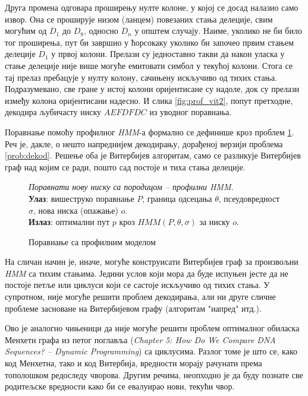 \documentclass[12pt,oneside]{memoir}
\newenvironment{problem}[1][!ht]
{\renewcommand{\algorithmcfname}{Проблем}
\begin{figure}[!ht]
\centering
  \begin{minipage}{.94\linewidth}
	\begin{algorithm}[#1]%
  }{\end{algorithm}
  \end{minipage}
\end{figure}}
\begin{document}
\begin{CJK}{UTF8}{ipxm}
Друга промена одговара проширењу нулте колоне, у којој се досад налазио само извор. Она се проширује низом (ланцем) повезаних стања делеције, свим могућим од $D_1$ до $D_8$, односно $D_n$ у општем случају. Наиме, уколико не би било тог проширења, пут би завршио у ћорсокаку уколико би започео првим стањем делеције $D_1$ у првој колони. Прелази су једноставно такви да након уласка у стање делеције није више могуће емитовати симбол у текућој колони. Стога се тај прелаз пребацује у нулту колону, сачињену искључиво од тихих стања. Подразумевано, све гране у истој колони оријентисане су надоле, док су прелази између колона оријентисани надесно. И слика \ref{fig:prof_vit2}, попут претходне, декодира љубичасту ниску $AEFDFDC$ из уводног поравнања.

Поравнање помоћу профилног \textit{HMM}-а формално се дефинише кроз проблем \ref{prob:poravnanje}. Реч је, дакле, о нешто напреднијем декодирању, дорађеној верзији проблема \ref{prob:dekod}. Решење оба је Витербијев алгоритам, само се разликује Витербијев граф над којим се ради, пошто сад постоје и тиха стања делеције.

\begin{problem}[H]
  \SetAlgoLined
  \textit{Поравнати нову ниску са породицом -- профилни \textit{HMM}.}\\
  \textbf{Улаз}: вишеструко поравнање $P$, граница одсецања $\theta$, псеудовредност $\sigma$, нова ниска (опажање) $o$.\\
  \textbf{Излаз}: оптимални пут $p$ кроз $HMM(P, \theta, \sigma)$ за ниску $o$.
  \caption{Поравнање са профилним моделом\cite{ba10g}}
  \label{prob:poravnanje}
\end{problem}

На сличан начин је, иначе, могуће конструисати Витербијев граф за произвољни \textit{HMM} са тихим стањима. Једини услов који мора да буде испуњен јесте да не постоје петље или циклуси који се састоје искључиво од тихих стања. У супротном, није могуће решити проблем декодирања, али ни друге сличне проблеме засноване на Витербијевом графу (алгоритам "напред" итд.).

Ово је аналогно чињеници да није могуће решити проблем оптималног обиласка Менхетн графа из петог поглавља (\textit{Chapter 5: How Do We Compare DNA Sequences? -- Dynamic Programming}) са циклусима. Разлог томе је што се, како код Менхетна, тако и код Витербија, вредности морају рачунати према тополошком редоследу чворова. Другим речима, неопходно је да буду познате све родитељске вредности како би се евалуирао нови, текући чвор.


\end{CJK}
\end{document}
